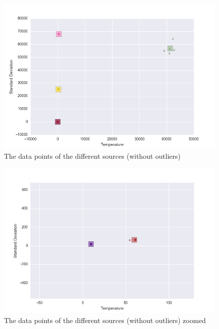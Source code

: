 \documentclass{article}
\begin{document}
\begin{figure}[!ht]
  \caption{The data points of the different sources (without outliers)}
  \label{fig:allsourcesmeans-no-outliers}
  \centering
    \includegraphics[width=1.0\textwidth]{allsourcesmeans_no_outliers}
\end{figure}

\begin{figure}[!ht]
  \caption{The data points of the different sources (without outliers) zoomed}
  \label{fig:allsourcesmeans-no-outliers-zoom}
  \centering
    \includegraphics[width=1.0\textwidth]{allsourcesmeans_no_outliers_zoom}
\end{figure}

\end{document}
